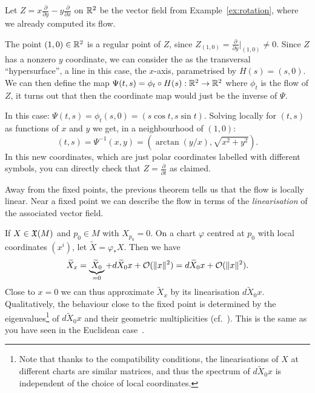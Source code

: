 \begin{example}\label{ex:hyplin}
	Let $Z = x\frac{\partial}{\partial y} - y\frac{\partial}{\partial x}$ on $\mathbb{R}^2$ be the vector field from Example~\ref{ex:rotation}, where we already computed its flow.

	The point $(1,0)\in\mathbb{R}^2$ is a regular point of $Z$, since $Z_{(1,0)} = \frac{\partial}{\partial y}\Big|_{(1,0)} \neq 0$.
	Since $Z$ has a nonzero $y$ coordinate, we can consider the as the transversal ``hypersurface'', a line in this case, the $x$-axis, parametrised by $H(s) = (s,0)$.
	We can then define the map $\Psi(t,s) = \phi_t\circ H(s) : \mathbb{R}^2\to\mathbb{R}^2$ where $\phi_t$ is the flow of $Z$, it turns out that then the coordinate map would just be the inverse of $\Psi$.

	In this case: $\Psi(t,s) = \phi_t(s,0) = (s\cos t, s\sin t)$.
	Solving locally for $(t,s)$ as functions of $x$ and $y$ we get, in a neighbourhood of $(1,0)$:
	\begin{equation}
		(t,s) = \Psi^{-1}(x,y) = \left(\arctan(y/x), \sqrt{x^2+y^2}\right).
	\end{equation}
	In this new coordinates, which are just polar coordinates labelled with different symbols, you can directly check that $Z = \frac{\partial}{\partial t}$ as claimed.
\end{example}

\begin{remark}
	Away from the fixed points, the previous theorem tells us that the flow is locally linear.
	Near a fixed point we can describe the flow in terms of the \emph{linearisation} of the associated vector field.

	If $X\in\mathfrak{X}(M)$ and $p_0\in M$ with $X_{p_0} = 0$. On a chart $\varphi$ centred at $p_0$ with local coordinates $(x^i)$, let $\widetilde X = \varphi_* X$.
	Then we have
	\begin{equation}
		\widetilde X_x = \underbrace{\widetilde X_0}_{=0} + d\widetilde X_0 x + \mathcal{O}(\|x\|^2) = d\widetilde X_0 x + \mathcal{O}(\|x\|^2).
	\end{equation}
	Close to $x=0$ we can thus approximate $\widetilde X_x$ by its linearisation $ d\widetilde X_0 x$.
	Qualitatively, the behaviour close to the fixed point is determined by the eigenvalues\footnote{Note that thanks to the compatibility conditions, the linearisations of $X$ at different charts are similar matrices, and thus the spectrum of $d\widetilde X_0 x$ is independent of the choice of local coordinates.} of $d\widetilde X_0 x$ and their geometric multiplicities (cf.~\cite[Figure 9.8]{book:lee}). This is the same as you have seen in the Euclidean case~\cite[Chapter 5.3]{book:knauf}.
\end{remark}

